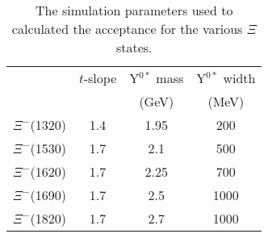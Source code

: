 \begin{table}[bhp]
\begin{minipage}{\columnwidth}
\begin{center}
\begin{singlespacing}

\caption[Simulation Parameters]{\label{tab:sim.params}The simulation parameters used to calculated the acceptance for the various $\Xi$ states.}

\begin{tabular}{lccc}

\hline \hline

 & $t$-slope & Y$^{0*}$ mass & Y$^{0*}$ width \\
 & & (GeV) & (MeV) \\

\hline

$\Xi^-$(1320) & 1.4 & 1.95 & 200 \\
$\Xi^-$(1530) & 1.7 & 2.1 & 500 \\
$\Xi^-$(1620) & 1.7 & 2.25 & 700 \\
$\Xi^-$(1690) & 1.7 & 2.5 & 1000 \\
$\Xi^-$(1820) & 1.7 & 2.7 & 1000 \\

\hline \hline

\end{tabular}

\end{singlespacing}
\end{center}
\end{minipage}
\end{table}
\vspace{20pt}